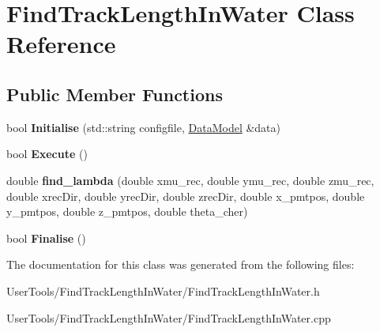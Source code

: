 \hypertarget{classFindTrackLengthInWater}{
\section{FindTrackLengthInWater Class Reference}
\label{classFindTrackLengthInWater}
}
\subsection*{Public Member Functions}
\begin{DoxyCompactItemize}
\item 
\hypertarget{classFindTrackLengthInWater_a0f902c566760c2df0693cf00e99cc47e}{
bool {\bfseries Initialise} (std::string configfile, \hyperlink{classDataModel}{DataModel} \&data)}
\label{classFindTrackLengthInWater_a0f902c566760c2df0693cf00e99cc47e}

\item 
\hypertarget{classFindTrackLengthInWater_a27d29773eced4222f316ade698247d50}{
bool {\bfseries Execute} ()}
\label{classFindTrackLengthInWater_a27d29773eced4222f316ade698247d50}

\item 
\hypertarget{classFindTrackLengthInWater_a714975810be358a8b6c127a9b7992dc6}{
double {\bfseries find\_\-lambda} (double xmu\_\-rec, double ymu\_\-rec, double zmu\_\-rec, double xrecDir, double yrecDir, double zrecDir, double x\_\-pmtpos, double y\_\-pmtpos, double z\_\-pmtpos, double theta\_\-cher)}
\label{classFindTrackLengthInWater_a714975810be358a8b6c127a9b7992dc6}

\item 
\hypertarget{classFindTrackLengthInWater_a1e9e6eaefc14833736544ebffb39eb1c}{
bool {\bfseries Finalise} ()}
\label{classFindTrackLengthInWater_a1e9e6eaefc14833736544ebffb39eb1c}

\end{DoxyCompactItemize}


The documentation for this class was generated from the following files:\begin{DoxyCompactItemize}
\item 
UserTools/FindTrackLengthInWater/FindTrackLengthInWater.h\item 
UserTools/FindTrackLengthInWater/FindTrackLengthInWater.cpp\end{DoxyCompactItemize}
